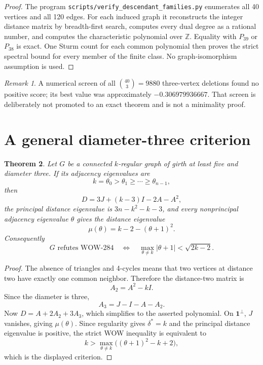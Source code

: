 \documentclass[11pt,reqno]{amsart}
\newcommand{\one}{\mathbf 1}
\theoremstyle{plain}
\newtheorem{theorem}{Theorem}[section]
\theoremstyle{definition}
\theoremstyle{remark}
\newtheorem{remark}[theorem]{Remark}
\begin{document}
\begin{proof}
The program \texttt{scripts/verify\_descendant\_families.py} enumerates all
40 vertices and all 120 edges.  For each induced graph it reconstructs the
integer distance matrix by breadth-first search, computes every dual degree
as a rational number, and computes the characteristic polynomial over
$\mathbb Z$.  Equality with $P_{39}$ or $P_{38}$ is exact.  One Sturm count
for each common polynomial then proves the strict spectral bound for every
member of the finite class.  No graph-isomorphism assumption is used.
\end{proof}

\begin{remark}
A numerical screen of all $\binom{40}{3}=9880$ three-vertex deletions found no
positive score; its best value was approximately $-0.306979936667$.  That
screen is deliberately not promoted to an exact theorem and is not a
minimality proof.
\end{remark}

\section{A general diameter-three criterion}\label{sec:diam3}

\begin{theorem}\label{thm:diam3}
Let $G$ be a connected $k$-regular graph of girth at least five and diameter
three.  If its adjacency eigenvalues are
\[
 k=\theta_0>\theta_1\ge\cdots\ge\theta_{n-1},
\]
then
\[
 D=3J+(k-3)I-2A-A^2,
\]
the principal distance eigenvalue is $3n-k^2-k-3$, and every nonprincipal
adjacency eigenvalue $\theta$ gives the distance eigenvalue
\[
 \mu(\theta)=k-2-(\theta+1)^2.
\]
Consequently
\[
 G\text{ refutes WOW-284}
 \quad\Longleftrightarrow\quad
 \max_{\theta\ne k}|\theta+1|<\sqrt{2k-2}.
\]
\end{theorem}

\begin{proof}
The absence of triangles and 4-cycles means that two vertices at distance two
have exactly one common neighbor.  Therefore the distance-two matrix is
\[
 A_2=A^2-kI.
\]
Since the diameter is three,
\[
 A_3=J-I-A-A_2.
\]
Now $D=A+2A_2+3A_3$, which simplifies to the asserted polynomial.  On
$\one^\perp$, $J$ vanishes, giving $\mu(\theta)$.  Since regularity gives
$\delta^*=k$ and the principal distance eigenvalue is positive, the strict
WOW inequality is equivalent to
\[
 k>\max_{\theta\ne k}\big((\theta+1)^2-k+2\big),
\]
which is the displayed criterion.
\end{proof}
\end{document}
